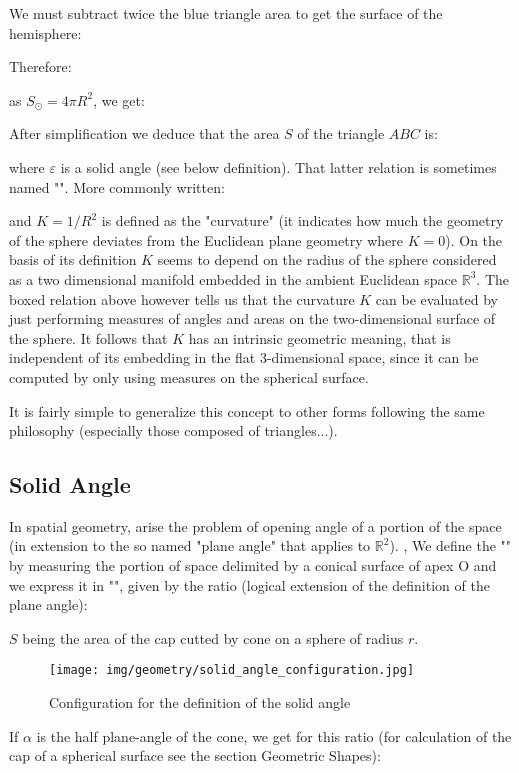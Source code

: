 	We must subtract twice the blue triangle area to get the surface of the hemisphere:
	
	Therefore:
	
	as $S_\odot=4\pi R^2$, we get:
	
	After simplification we deduce that the area $S$ of the triangle $ABC$ is:
	
	where $\varepsilon$ is a solid angle (see below definition). That latter relation is sometimes named "". More commonly written:
	
	and $K=1/R^2$ is defined as the "curvature" (it indicates how much the geometry of the sphere deviates from the Euclidean plane geometry where $K=0$). On the basis of its definition $K$ seems to depend on the radius of the sphere considered as a two dimensional manifold embedded in the ambient Euclidean space $\mathbb{R}^3$. The boxed relation above however tells us that the curvature $K$ can be evaluated by just performing measures of angles and areas on the two-dimensional surface of the sphere. It follows that $K$ has an intrinsic geometric meaning, that is independent of its embedding in the flat 3-dimensional space, since it can be computed by only using measures on the spherical surface. 
	
	It is fairly simple to generalize this concept to other forms following the same philosophy (especially those composed of triangles...).
	
	\subsection{Solid Angle}\label{solid angle}
	In spatial geometry, arise the problem of opening angle of a portion of the space (in extension to the so named "plane angle" that applies to $\mathbb{R}^2$). , We define the "" by measuring the portion of space delimited by a conical surface of apex $\text{O}$ and we express it in "", given by the ratio (logical extension of the definition of the plane angle):
	
	$S$ being the area of the cap cutted by cone on a sphere of radius $r$.
	
	\begin{figure}[H]
		\centering
		\texttt{[image: img/geometry/solid\_angle\_configuration.jpg]}
		\caption{Configuration for the definition of the solid angle}
	\end{figure}
	If $\alpha$ is the half plane-angle of the cone, we get for this ratio (for calculation of the cap of a spherical surface see the section Geometric Shapes):
	
